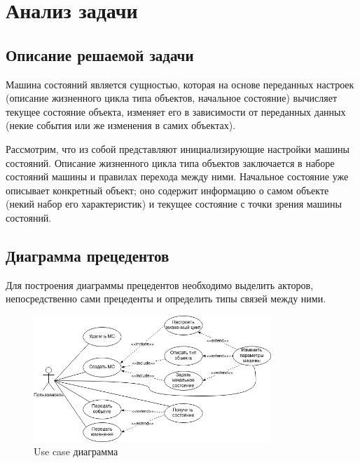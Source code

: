 \documentclass[a4paper,10pt]{article}
\begin{document}


\section{Анализ задачи}

\subsection{Описание решаемой задачи}

Машина состояний является сущностью, которая на основе
переданных настроек (описание жизненного цикла типа объектов, начальное состояние)
вычисляет текущее состояние объекта, изменяет его в зависимости от переданных данных
(некие события или же изменения в самих объектах).

Рассмотрим, что из собой представляют инициализирующие настройки машины состояний.
Описание жизненного цикла типа объектов заключается в наборе состояний машины и
правилах перехода между ними. Начальное состояние уже описывает конкретный объект;
оно содержит информацию о самом объекте (некий набор его характеристик) и текущее
состояние с точки зрения машины состояний.


\subsection{Диаграмма прецедентов}

Для построения диаграммы прецедентов необходимо выделить акторов, непосредственно
сами прецеденты и определить типы связей между ними.



\begin{figure}[htpb]
    \centering
    \includegraphics[width=0.8\textwidth]{Use Case}
    \caption{Use case диаграмма}
    \label{fig:useCase}
\end{figure}
\end{document}
